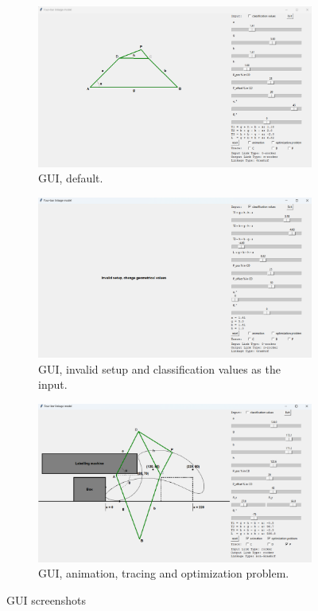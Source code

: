 \documentclass{article}
\begin{document}
\begin{figure}[h]
	\centering
	\begin{subfigure}{0.7\textwidth}
		\centering
		\includegraphics[width=\linewidth]{./figures/GUI_screenshots/GUI_default.png}
		\caption{GUI, default.}
		\label{fig:GUI_default}
	\end{subfigure}
	\vfill
	\begin{subfigure}{0.7\textwidth}
		\centering
		\includegraphics[width=\linewidth]{./figures/GUI_screenshots/GUI_invalid_setup.png}
		\caption{GUI, invalid setup and classification values as the input.}
		\label{fig:GUI_invalid}
	\end{subfigure}
	\vfill
	\begin{subfigure}{0.7\textwidth}
		\centering
		\includegraphics[width=\linewidth]{./figures/GUI_screenshots/GUI_optimization_problem.png}
		\caption{GUI, animation, tracing and optimization problem.}
		\label{fig:GUI_optimization_problem}
	\end{subfigure}
	\caption{GUI screenshots}
\end{figure}
\end{document}
